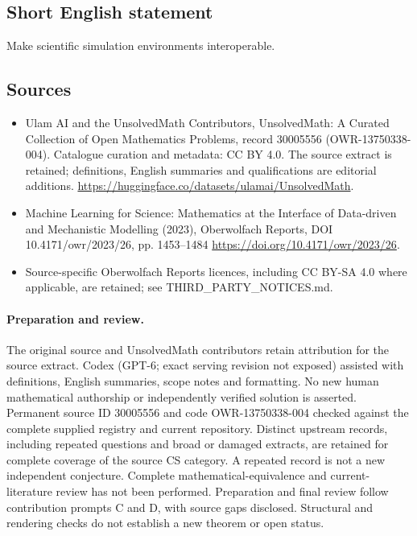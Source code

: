 \documentclass[11pt]{article}
\begin{document}
\subsection{Short English statement}
Make scientific simulation environments interoperable.
\subsection{Sources}
\begin{itemize}
\item[\hypertarget{source:30005556:1}{S1}] Ulam AI and the UnsolvedMath Contributors, UnsolvedMath: A Curated Collection of Open Mathematics Problems, record 30005556 (OWR-13750338-004). Catalogue curation and metadata: CC BY 4.0. The source extract is retained; definitions, English summaries and qualifications are editorial additions.
\url{https://huggingface.co/datasets/ulamai/UnsolvedMath}.
\item[\hypertarget{source:30005556:2}{S2}] Machine Learning for Science: Mathematics at the Interface of Data-driven and Mechanistic Modelling (2023), Oberwolfach Reports, DOI 10.4171/owr/2023/26, pp. 1453--1484
\url{https://doi.org/10.4171/owr/2023/26}.
\item Source-specific Oberwolfach Reports licences, including CC BY-SA 4.0 where applicable, are retained; see THIRD\_PARTY\_NOTICES.md.
\end{itemize}
\paragraph{Preparation and review.}
The original source and UnsolvedMath contributors retain attribution for the source extract. Codex (GPT-6; exact serving revision not exposed) assisted with definitions, English summaries, scope notes and formatting. No new human mathematical authorship or independently verified solution is asserted. Permanent source ID 30005556 and code OWR-13750338-004 checked against the complete supplied registry and current repository. Distinct upstream records, including repeated questions and broad or damaged extracts, are retained for complete coverage of the source CS category. A repeated record is not a new independent conjecture. Complete mathematical-equivalence and current-literature review has not been performed. Preparation and final review follow contribution prompts C and D, with source gaps disclosed. Structural and rendering checks do not establish a new theorem or open status.
\label{end:30005556}
\end{document}
